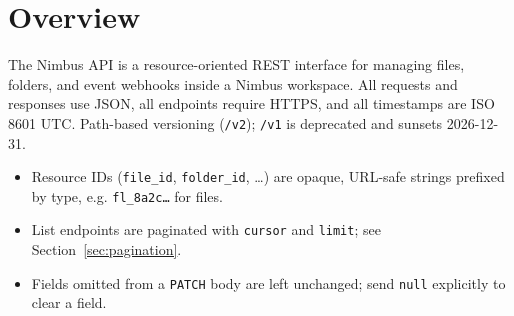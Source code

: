 \section{Overview}
The Nimbus API is a resource-oriented REST interface for managing files, folders, and
event webhooks inside a Nimbus workspace. All requests and responses use JSON, all
endpoints require HTTPS, and all timestamps are ISO\,8601 UTC. Path-based versioning
(\texttt{/v2}); \texttt{/v1} is deprecated and sunsets 2026-12-31.

\begin{itemize}[leftmargin=14pt,itemsep=1pt,topsep=1pt]
  \item Resource IDs (\texttt{file\_id}, \texttt{folder\_id}, \dots) are opaque, URL-safe
    strings prefixed by type, e.g. \texttt{fl\_8a2c\dots} for files.
  \item List endpoints are paginated with \texttt{cursor} and \texttt{limit}; see
    Section~\ref{sec:pagination}.
  \item Fields omitted from a \texttt{PATCH} body are left unchanged; send \texttt{null}
    explicitly to clear a field.
\end{itemize}

